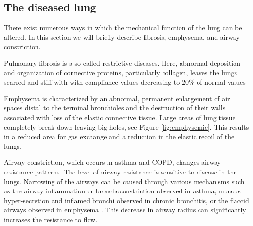 \subsection{The diseased lung}
There exist numerous ways in which the mechanical function of the lung can be altered. In this section we will briefly describe fibrosis, emphysema, and airway constriction.


Pulmonary fibrosis is a so-called restrictive diseases. Here, abnormal deposition and organization of connective proteins, particularly collagen, leaves the lungs scarred and stiff with with compliance values decreasing to $20\%$ of normal values \citep{bates2009lung,cotes2009lung}


Emphysema is characterized by an abnormal, permanent enlargement of air spaces distal to the terminal bronchioles and the destruction of their walls associated with loss of the elastic connective tissue. Large areas of lung tissue completely break down leaving big holes, see Figure \ref{fig:emphysemic}. This results in a reduced area for gas exchange and a reduction in the elastic recoil of the lungs. 

Airway constriction, which occurs in asthma and COPD, changes airway resistance patterns. The level of airway resistance is sensitive to disease in the lungs. Narrowing of the airways can be caused through various mechanisms such as the airway inflammation or bronchoconstriction observed in asthma, mucous hyper-secretion and inflamed bronchi observed in chronic bronchitis, or the flaccid airways observed in emphysema \citep{HedgesThesis}. This decrease in airway radius can significantly increases the resistance to flow.








